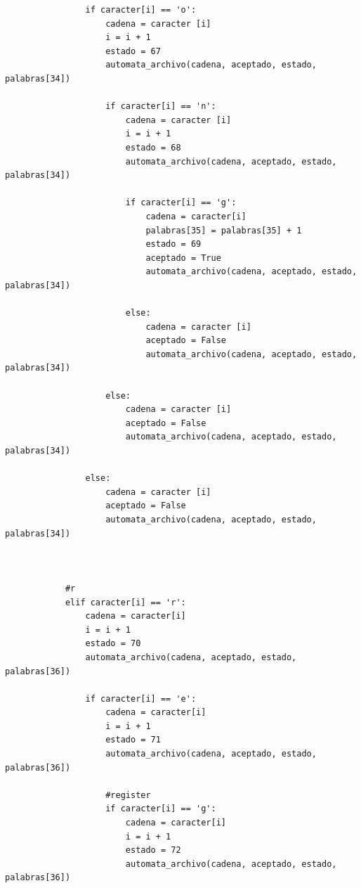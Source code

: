 \documentclass{article}
\begin{document}
\begin{flushleft}
\begin{lstlisting}
                if caracter[i] == 'o':
                    cadena = caracter [i]
                    i = i + 1
                    estado = 67
                    automata_archivo(cadena, aceptado, estado, palabras[34])   
                    
                    if caracter[i] == 'n':
                        cadena = caracter [i]
                        i = i + 1
                        estado = 68
                        automata_archivo(cadena, aceptado, estado, palabras[34])
                        
                        if caracter[i] == 'g':
                            cadena = caracter[i]
                            palabras[35] = palabras[35] + 1
                            estado = 69
                            aceptado = True
                            automata_archivo(cadena, aceptado, estado, palabras[34])
                            
                        else:
                            cadena = caracter [i]
                            aceptado = False
                            automata_archivo(cadena, aceptado, estado, palabras[34])
                            
                    else:
                        cadena = caracter [i]
                        aceptado = False
                        automata_archivo(cadena, aceptado, estado, palabras[34])
                
                else:
                    cadena = caracter [i]
                    aceptado = False
                    automata_archivo(cadena, aceptado, estado, palabras[34])
              
                
            
            #r
            elif caracter[i] == 'r':
                cadena = caracter[i]
                i = i + 1
                estado = 70
                automata_archivo(cadena, aceptado, estado, palabras[36])
                
                if caracter[i] == 'e':
                    cadena = caracter[i]
                    i = i + 1
                    estado = 71
                    automata_archivo(cadena, aceptado, estado, palabras[36])
                    
                    #register
                    if caracter[i] == 'g':
                        cadena = caracter[i]
                        i = i + 1
                        estado = 72
                        automata_archivo(cadena, aceptado, estado, palabras[36])
                        

\end{lstlisting}
\end{flushleft}
\end{document}
